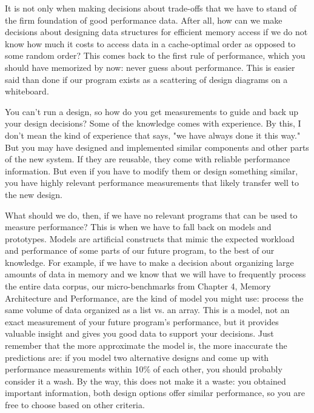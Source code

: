 It is not only when making decisions about trade-offs that we have to stand of the firm foundation of good performance data. After all, how can we make decisions about designing data structures for efficient memory access if we do not know how much it costs to access data in a cache-optimal order as opposed to some random order? This comes back to the first rule of performance, which you should have memorized by now: never guess about performance. This is easier said than done if our program exists as a scattering of design diagrams on a whiteboard. 

You can't run a design, so how do you get measurements to guide and back up your design decisions? Some of the knowledge comes with experience. By this, I don't mean the kind of experience that says, "we have always done it this way." But you may have designed and implemented similar components and other parts of the new system. If they are reusable, they come with reliable performance information. But even if you have to modify them or design something similar, you have highly relevant performance measurements that likely transfer well to the new design. 

What should we do, then, if we have no relevant programs that can be used to measure performance? This is when we have to fall back on models and prototypes. Models are artificial constructs that mimic the expected workload and performance of some parts of our future program, to the best of our knowledge. For example, if we have to make a decision about organizing large amounts of data in memory and we know that we will have to frequently process the entire data corpus, our micro-benchmarks from Chapter 4, Memory Architecture and Performance, are the kind of model you might use: process the same volume of data organized as a list vs. an array. This is a model, not an exact measurement of your future program's performance, but it provides valuable insight and gives you good data to support your decisions. Just remember that the more approximate the model is, the more inaccurate the predictions are: if you model two alternative designs and come up with performance measurements within 10\% of each other, you should probably consider it a wash. By the way, this does not make it a waste: you obtained important information, both design options offer similar performance, so you are free to choose based on other criteria. 

